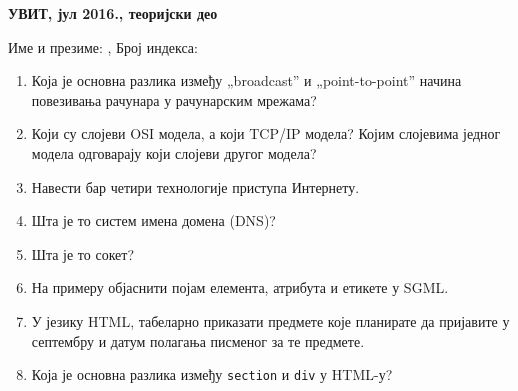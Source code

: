 \documentclass[a4paper]{article}
\begin{document}
\begin{center}
\textbf{УВИТ, јул 2016., теоријски део}  
\end{center}
Име и презиме: \hrulefill, Број индекса: \hrulefill
\begin{enumerate}
\item Која је основна разлика између „broadcast” и „point-to-point” начина
повезивања рачунара у рачунарским мрежама?

\hrulefill

\hrulefill

\hrulefill

\item Који су слојеви OSI модела, а који TCP/IP модела? Којим слојевима
једног модела одговарају који слојеви другог модела?

\hrulefill

\hrulefill

\hrulefill

\item Навести бар четири технологије приступа Интернету.

\hrulefill

\hrulefill

\hrulefill

\item Шта је то систем имена домена (DNS)?

\hrulefill

\hrulefill

\hrulefill

\item Шта је то сокет?

\hrulefill

\hrulefill

\hrulefill

\item На примеру објаснити појам елемента, атрибута и етикете у SGML.

\hrulefill

\hrulefill

\hrulefill

\item У језику HTML, табеларно приказати предмете које планирате да
пријавите у септембру и датум полагања писменог за те предмете.

\hrulefill

\hrulefill

\hrulefill

\item Која је основна разлика између \verb|section| и \verb|div| у HTML-у?


\end{enumerate}
\end{document}
